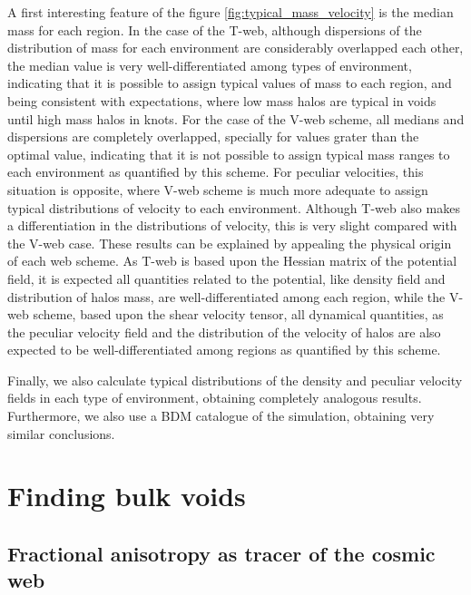 \documentclass[a4,useAMS,usenatbib,usegraphicx]{latex/mn2e}
\begin{document}
A first interesting feature of the figure  \ref{fig:typical_mass_velocity} 
is the median mass for each region. In the case of the T-web, although 
dispersions of the distribution of mass for each environment are 
considerably overlapped each other, the median value is very 
well-differentiated among types of environment, indicating that it is 
possible to assign typical values of mass to each region, and being 
consistent with expectations, where low mass halos are typical in voids 
until high mass halos in knots. For the case of the V-web scheme, all
medians and dispersions are completely overlapped, specially for values 
grater than the optimal \lth value, indicating that it is not possible to
assign typical mass ranges to each environment as quantified by this 
scheme. For peculiar velocities, this situation is opposite, where V-web
scheme is much more adequate to assign typical distributions of velocity
to each environment. Although T-web also makes a differentiation in the 
distributions of velocity, this is very slight compared with the V-web 
case. These results can be explained by appealing the physical origin of 
each web scheme. As T-web is based upon the Hessian matrix of the 
potential field, it is expected all quantities related to the potential, 
like density field and distribution of halos mass, are well-differentiated 
among each region, while the V-web scheme, based upon the shear velocity 
tensor, all dynamical quantities, as the peculiar velocity field and the 
distribution of the velocity of halos are also expected to be 
well-differentiated among regions as quantified by this scheme.



Finally, we also calculate typical distributions of the density and 
peculiar velocity fields in each type of environment, obtaining completely
analogous results. Furthermore, we also use a BDM catalogue of the 
simulation, obtaining very similar conclusions.



\section{Finding bulk voids}
\label{sec:bulk_voids}


\subsection{Fractional anisotropy as tracer of the cosmic web}
\label{subsec:FA_web}
\end{document}
